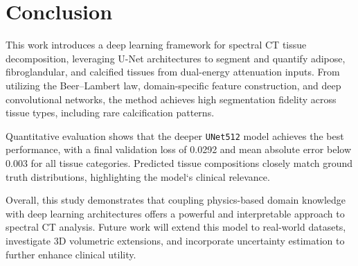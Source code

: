 \section{Conclusion}\label{sec:conclusion}

This work introduces a deep learning framework for spectral CT tissue decomposition, leveraging U-Net 
architectures to segment and quantify adipose, fibroglandular, and calcified tissues from dual-energy attenuation inputs. 
From utilizing the Beer–Lambert law, domain-specific feature construction, and deep convolutional 
networks, the method achieves high segmentation fidelity across tissue types, including rare calcification patterns.

Quantitative evaluation shows that the deeper \texttt{UNet512} model achieves the best performance, with a final validation 
loss of 0.0292 and mean absolute error below 0.003 for all tissue categories. Predicted tissue compositions closely match 
ground truth distributions, highlighting the model`s clinical relevance.

Overall, this study demonstrates that coupling physics-based domain knowledge with deep learning architectures offers a 
powerful and interpretable approach to spectral CT analysis. Future work will extend this model to real-world datasets, 
investigate 3D volumetric extensions, and incorporate uncertainty estimation to further enhance clinical utility.

